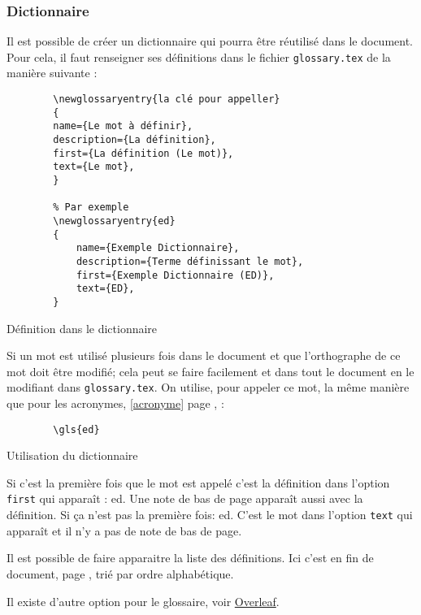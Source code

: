 \subsubsection{Dictionnaire} \label{dictionnaire}
Il est possible de créer un dictionnaire qui pourra être réutilisé dans le document.
Pour cela, il faut renseigner ses définitions dans le fichier \verb=glossary.tex= de la manière suivante :
\begin{code}
    \begin{verbatim}
        \newglossaryentry{la clé pour appeller}
        {
        name={Le mot à définir},
        description={La définition},
        first={La définition (Le mot)},
        text={Le mot},
        }

        % Par exemple
        \newglossaryentry{ed}
        {
            name={Exemple Dictionnaire},
            description={Terme définissant le mot},
            first={Exemple Dictionnaire (ED)},
            text={ED},
        }
\end{verbatim}
    \caption{Définition dans le dictionnaire}
\end{code}

Si un mot est utilisé plusieurs fois dans le document et que l'orthographe de ce mot doit être modifié;
cela peut se faire facilement et dans tout le document en le modifiant dans \verb=glossary.tex=.
On utilise, pour appeler ce mot, la même manière que pour les acronymes, \ref{acronyme} page \pageref{acronyme}, :
\begin{code}
    \begin{verbatim}
        \gls{ed}
\end{verbatim}
    \caption{Utilisation du dictionnaire}
\end{code}

Si c'est la première fois que le mot est appelé c'est la définition dans l'option \verb=first= qui apparaît : \gls{ed}.
Une note de bas de page apparaît aussi avec la définition. \newline
Si ça n'est pas la première fois: \gls{ed}. C'est le mot dans l'option \verb=text= qui apparaît et il n'y a pas de note de bas de page.

Il est possible de faire apparaitre la liste des définitions. Ici c'est en fin de document,
page \pageref{dictionnaireDomaine}, trié par ordre alphabétique.

Il existe d'autre option pour le glossaire, voir \href{https://fr.overleaf.com/learn/latex/Glossaries}{Overleaf}.

